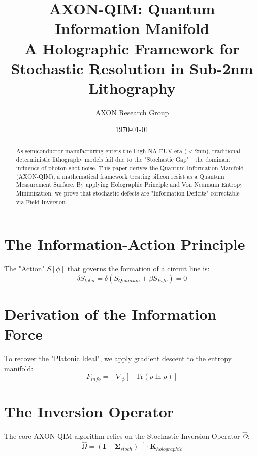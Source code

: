 \documentclass[11pt, a4paper]{article}
\title{\textbf{AXON-QIM: Quantum Information Manifold}\\ \large A Holographic Framework for Stochastic Resolution in Sub-2nm Lithography}
\author{AXON Research Group}
\date{\today}
\begin{document}
\maketitle

\begin{abstract}
As semiconductor manufacturing enters the High-NA EUV era ($<$2nm), traditional deterministic lithography models fail due to the "Stochastic Gap"---the dominant influence of photon shot noise. This paper derives the Quantum Information Manifold (AXON-QIM), a mathematical framework treating silicon resist as a Quantum Measurement Surface. By applying Holographic Principle and Von Neumann Entropy Minimization, we prove that stochastic defects are "Information Deficits" correctable via Field Inversion.
\end{abstract}

\section{The Information-Action Principle}
The "Action" $S[\phi]$ that governs the formation of a circuit line is:
\begin{equation}
    \delta S_{total} = \delta (S_{Quantum} + \beta S_{Info}) = 0
\end{equation}

\section{Derivation of the Information Force}
To recover the "Platonic Ideal", we apply gradient descent to the entropy manifold:
\begin{equation}
    F_{info} = -\nabla_{\phi} \left[ - \text{Tr}(\rho \ln \rho) \right]
\end{equation}

\section{The Inversion Operator}
The core AXON-QIM algorithm relies on the Stochastic Inversion Operator $\hat{\Omega}$:
\begin{equation}
    \hat{\Omega} = (\mathbf{I} - \mathbf{\Sigma}_{stoch})^{-1} \cdot \mathbf{K}_{holographic}
\end{equation}
\end{document}
